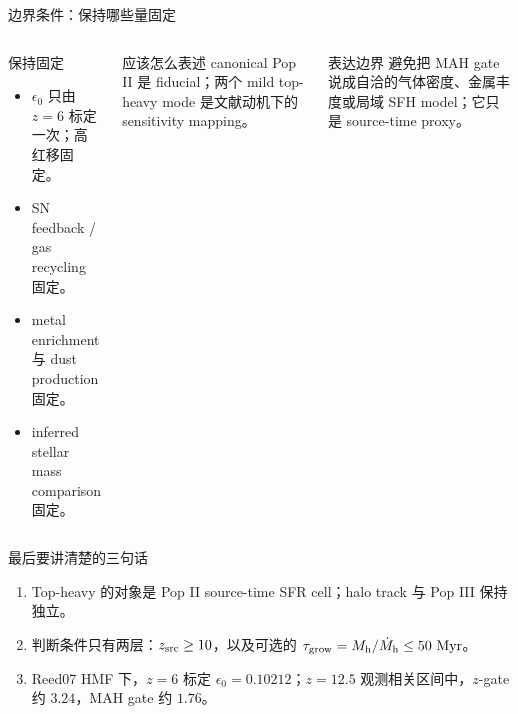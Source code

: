 \documentclass[10pt,aspectratio=169]{beamer}
\begin{document}
\begin{NAOCBlankPage}{边界条件：保持哪些量固定}
\begin{columns}[T,onlytextwidth]
  \begin{block}{保持固定}
  \begin{itemize}
    \item \(\epsilon_0\) 只由 \(z=6\) 标定一次；高红移固定。
    \item SN feedback / gas recycling 固定。
    \item metal enrichment 与 dust production 固定。
    \item inferred stellar mass comparison 固定。
  \end{itemize}
  \end{block}

  \begin{block}{应该怎么表述}
  canonical Pop II 是 fiducial；两个 mild top-heavy mode 是文献动机下的 sensitivity mapping。
  \end{block}
  \begin{block}{表达边界}
  避免把 MAH gate 说成自洽的气体密度、金属丰度或局域 SFH model；它只是 source-time proxy。
  \end{block}
\end{columns}
\end{NAOCBlankPage}

\begin{NAOCBlankPage}{最后要讲清楚的三句话}
\begin{enumerate}
  \item Top-heavy 的对象是 Pop II source-time SFR cell；halo track 与 Pop III 保持独立。
  \item 判断条件只有两层：\(z_{\rm src}\ge10\)，以及可选的 \(\tau_{\rm grow}=M_{\rm h}/\dot M_{\rm h}\le50~{\rm Myr}\)。
  \item Reed07 HMF 下，\(z=6\) 标定 \(\epsilon_0=0.10212\)；\(z=12.5\) 观测相关区间中，\(z\)-gate 约 \(3.24\)，MAH gate 约 \(1.76\)。
\end{enumerate}
\end{NAOCBlankPage}

\end{document}
